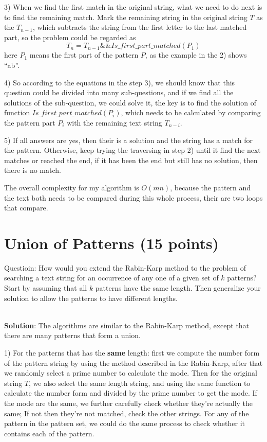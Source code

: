 \documentclass{article}
\begin{document}
3) When we find the first match in the original string, what we need to do next is to find the remaining match. Mark the remaining string in the original string $T$ as the $T_{n-1}$, which subtracts the string from the first letter to the last matched part, so the problem could be regarded as $$ T_{n} = T_{n-1} \&\& Is\_first\_part\_matched(P_{1}) $$ here $P_{1}$ means the first part of the pattern $P$, as the example in the 2) shows ``ab''.

4) So according to the equations in the step 3), we should know that this question could be divided into many sub-questions, and if we find all the solutions of the sub-question, we could solve it, the key is to find the solution of function $Is\_first\_part\_matched(P_{i})$, which needs to be calculated by comparing the pattern part $P_{i}$ with the remaining text string $T_{n-i}$.

5) If all answers are yes, then their is a solution and the string has a match for the pattern. Otherwise, keep trying the traversing in step 2) until it find the next matches or reached the end, if it has been the end but still has no solution, then there is no match.

The overall complexity for my algorithm is $O(mn)$, because the pattern and the text both needs to be compared during this whole process, their are two loops that compare.


\section{Union of Patterns (15 points)}
Questioin: How would you extend the Rabin-Karp method to the problem of searching a text string for an occurrence of any one of a given set of $k$ patterns? Start by assuming that all $k$ patterns have the same length. Then generalize your solution to allow the patterns to have different lengths.

~\\
\textbf{Solution}:\newline
\indent The algorithms are similar to the Rabin-Karp method, except that there are many patterns that form a union.

1) For the patterns that has the \textbf{same} length: first we compute the number form of the pattern string by using the method described in the Rabin-Karp, after that we randomly select a prime number to calculate the mode. Then for the original string $T$, we also select the same length string, and using the same function to calculate the number form and divided by the prime number to get the mode. If the mode are the same, we further carefully check whether they're actually the same; If not then they're not matched, check the other strings. For any of the pattern in the pattern set, we could do the same process to check whether it contains each of the pattern.
\end{document}
